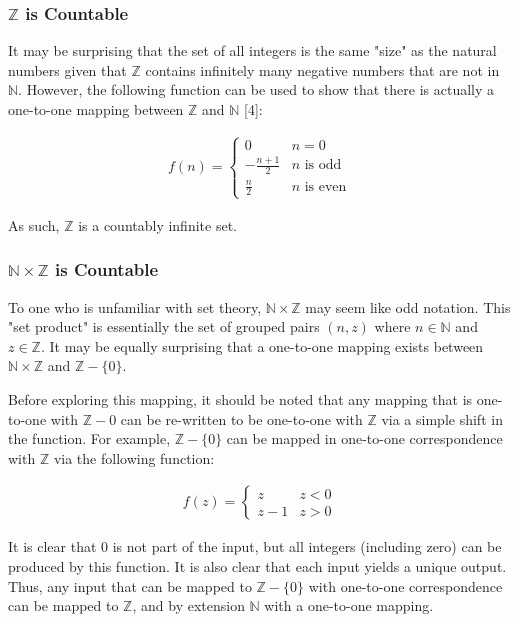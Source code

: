 \documentclass{article}
\begin{document}
\subsubsection{$\mathbb{Z}$ is Countable}
It may be surprising that the set of all integers is the same "size" as the natural numbers given that $\mathbb{Z}$ contains infinitely many negative numbers that are not in $\mathbb{N}$.  However, the following function can be used to show that there is actually a one-to-one mapping between $\mathbb{Z}$ and $\mathbb{N}$ [4]:

\begin{gather*}
f(n) = \begin{cases}
      0 & n = 0 \\
      -\frac{n+1}{2} & n \text{ is odd} \\
      \frac{n}{2} & n \text{ is even}
   \end{cases}
\end{gather*}

As such, $\mathbb{Z}$ is a countably infinite set.

\subsubsection{$\mathbb{N} \times \mathbb{Z}$ is Countable}
To one who is unfamiliar with set theory, $\mathbb{N} \times \mathbb{Z}$ may seem like odd notation.  This "set product" is essentially the set of grouped pairs $(n, z)$ where $n \in \mathbb{N}$ and $z \in \mathbb{Z}$.  It may be equally surprising that a one-to-one mapping exists between $\mathbb{N} \times \mathbb{Z}$ and $\mathbb{Z} - \{0\}$.

Before exploring this mapping, it should be noted that any mapping that is one-to-one with $\mathbb{Z} - {0}$ can be re-written to be one-to-one with $\mathbb{Z}$ via a simple shift in the function.  For example, $\mathbb{Z} - \{0\}$ can be mapped in one-to-one correspondence with $\mathbb{Z}$ via the following function:

\begin{gather*}
f(z) = \begin{cases}
      z & z < 0 \\
      z - 1 & z > 0
   \end{cases}
\end{gather*}

It is clear that 0 is not part of the input, but all integers (including zero) can be produced by this function.  It is also clear that each input yields a unique output.  Thus, any input that can be mapped to $\mathbb{Z} - \{0\}$ with one-to-one correspondence can be mapped to $\mathbb{Z}$, and by extension $\mathbb{N}$ with a one-to-one mapping.
\end{document}
